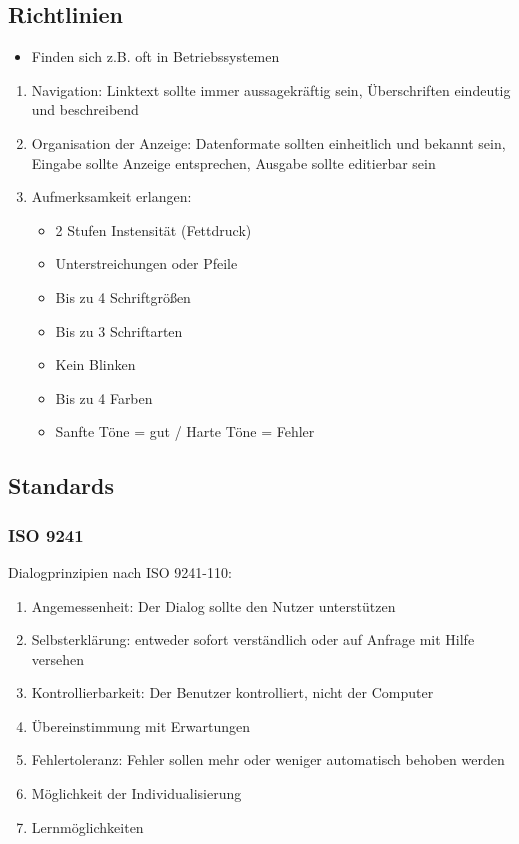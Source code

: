 \subsection{Richtlinien}

\begin{itemize}
\item
  Finden sich z.B. oft in Betriebssystemen
\end{itemize}

\begin{enumerate}[1.]
\item
  Navigation: Linktext sollte immer aussagekräftig sein, Überschriften
  eindeutig und beschreibend
\item
  Organisation der Anzeige: Datenformate sollten einheitlich und bekannt
  sein, Eingabe sollte Anzeige entsprechen, Ausgabe sollte editierbar
  sein
\item
  Aufmerksamkeit erlangen:

  \begin{itemize}
  \item
    2 Stufen Instensität (Fettdruck)
  \item
    Unterstreichungen oder Pfeile
  \item
    Bis zu 4 Schriftgrößen
  \item
    Bis zu 3 Schriftarten
  \item
    Kein Blinken
  \item
    Bis zu 4 Farben
  \item
    Sanfte Töne = gut / Harte Töne = Fehler
  \end{itemize}
\end{enumerate}

\subsection{Standards}

\subsubsection{ISO 9241}

Dialogprinzipien nach ISO 9241-110:

\begin{enumerate}[1.]
\item
  Angemessenheit: Der Dialog sollte den Nutzer unterstützen
\item
  Selbsterklärung: entweder sofort verständlich oder auf Anfrage mit
  Hilfe versehen
\item
  Kontrollierbarkeit: Der Benutzer kontrolliert, nicht der Computer
\item
  Übereinstimmung mit Erwartungen
\item
  Fehlertoleranz: Fehler sollen mehr oder weniger automatisch behoben
  werden
\item
  Möglichkeit der Individualisierung
\item
  Lernmöglichkeiten
\end{enumerate}

